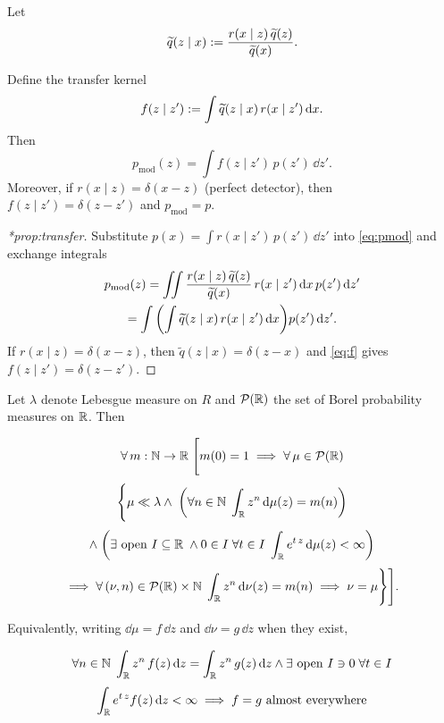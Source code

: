 \begin{theorem}
\noproofref
Let
\begin{equation}
    \widetilde{q}(z\mid x) :=\frac{r(x\mid z)\,\widetilde{q}(z)}{\widetilde{q}(x)}.
\end{equation}

Define the transfer kernel
\begin{equation}
    f(z\mid z') := \int \widetilde{q}(z\mid x)\,r(x\mid z')\,\dd x.
\end{equation}
Then
\begin{equation}
    p_{\mathrm{mod}}(z) = \int f(z\mid z')\,p(z')\,\dd z'.
\end{equation}
Moreover, if $r(x\mid z)=\delta(x-z)$ (perfect detector), then $f(z\mid z')=\delta(z-z')$ and $p_{\mathrm{mod}}=p$.
\end{theorem}

\begin{proof}[*prop:transfer]
Substitute $p(x)=\int r(x\mid z')\,p(z')\,\dd z'$ into \cref{eq:pmod} and exchange integrals
\begin{gather}
p_{\mathrm{mod}}(z) = \iint \frac{r(x\mid z)\,\widetilde{q}(z)}{\widetilde{q}(x)}\,r(x\mid z')\,\dd x\,p(z')\,\dd z'\\
=\int \qty(\int \widetilde{q}(z\mid x)\,r(x\mid z')\,\dd x) p(z')\,\dd z'.
\end{gather}
If $r(x\mid z)=\delta(x-z)$, then $\tilde q(z\mid x)=\delta(z-x)$ and \cref{eq:f} gives $f(z\mid z')=\delta(z-z')$.
\end{proof}


\begin{theorem}
\noproofref
\noproofref

Let $\lambda$ denote Lebesgue measure on $R$ and $\mathcal{P}(\mathbb{R})$ the set of Borel probability measures on $\mathbb{R}$. Then

\[
\forall\, m:\mathbb{N}\to\mathbb{R}\;\Bigg[
    m(0) = 1 \implies \forall\, \mu\in\mathcal{P}(\mathbb{R})\]
    \[\nonumber\Bigg\{
        \mu\ll\lambda
        \land\;\qty(
            \forall n\in\mathbb{N}\; \int_{\mathbb{R}} z^n\,\dd\mu(z)=m(n))
    \]
    \[\nonumber \land\;\qty(\exists\text{ open }I\subseteq\mathbb{R}\;\land 0\in I\;\forall t\in I\;
\int_{\mathbb{R}} e^{t\,z}\,\dd\mu(z)<\infty)\]
\[\nonumber
\implies \forall\, (\nu, n)\in\mathcal{P}(\mathbb{R})\times\mathbb{N}\;\int_{\mathbb{R}} z^n\,\dd\nu(z)=m(n)
\implies \nu=\mu\Bigg\}\Bigg].
\]

Equivalently, writing $\dd\mu=f\,\dd z$ and $\dd\nu=g\,\dd z$ when they exist,

\[
\forall n\in\mathbb{N}\; \int_{\mathbb{R}} z^n\, f(z)\,\dd z=\int_{\mathbb{R}} z^n\, g(z)\,\dd z \land \exists\text{ open }I\ni 0\;\forall t\in I
\]
\[\nonumber
\int_{\mathbb{R}} e^{t\,z} f(z)\,\dd z<\infty
\implies f=g\ \text{almost everywhere}
\]
\end{theorem}


